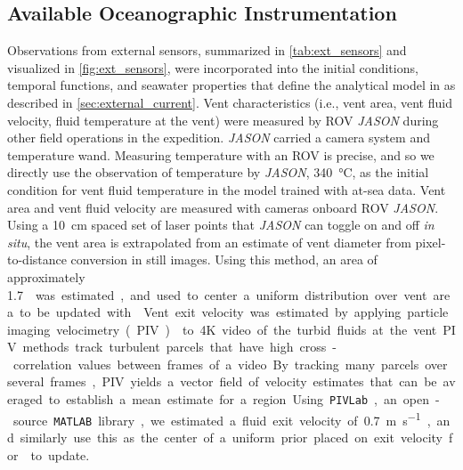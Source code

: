 \subsection{Available Oceanographic Instrumentation}
\label{sec:aux_sensors}
Observations from external sensors, summarized in \cref{tab:ext_sensors} and visualized in \cref{fig:ext_sensors}, were incorporated into the initial conditions, temporal functions, and seawater properties that define the analytical model in \PHUMES as described in \cref{sec:external_current}. Vent characteristics (i.e., vent area, vent fluid velocity, fluid temperature at the vent) were measured by ROV \emph{JASON} during other field operations in the expedition. \emph{JASON} carried a camera system and temperature wand. Measuring temperature with an ROV is precise, and so we directly use the observation of temperature by \emph{JASON}, \SI{340}{\celsius}, as the initial condition for vent fluid temperature in the \PHUMES model trained with at-sea data. Vent area and vent fluid velocity are measured with cameras onboard ROV \emph{JASON}. Using a \SI{10}{\centi\meter} spaced set of laser points that \emph{JASON} can toggle on and off \emph{in situ}, the vent area is extrapolated from an estimate of vent diameter from pixel-to-distance conversion in still images. Using this method, an area of approximately \SI{1.7}{\meter\square} was estimated, and used to center a uniform distribution over vent area to be updated with \PHUMES. Vent exit velocity was estimated by applying particle imaging velocimetry (PIV) \autocite{zhang2019time} to 4K video of the turbid fluids at the vent. PIV methods track turbulent parcels that have high cross-correlation values between frames of a video. By tracking many parcels over several frames, PIV yields a vector field of velocity estimates that can be averaged to establish a mean estimate for a region. Using \verb|PIVLab|, an open-source \verb|MATLAB| library, we estimated a fluid exit velocity of \SI{0.7}{\meter\per\second}, and similarly use this as the center of a uniform prior placed on exit velocity for \PHUMES to update.

